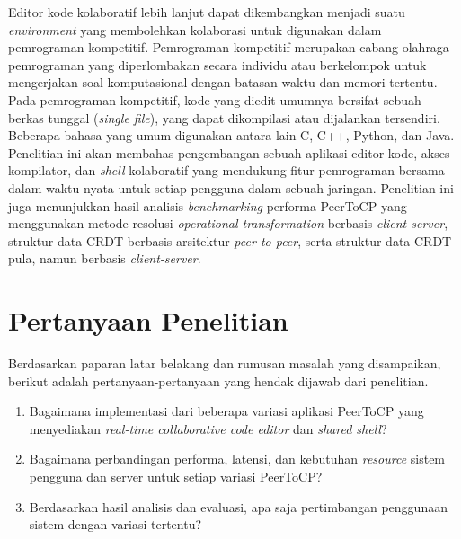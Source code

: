 Editor kode kolaboratif lebih lanjut dapat dikembangkan menjadi suatu \textit{environment} yang membolehkan kolaborasi untuk digunakan dalam pemrograman kompetitif. Pemrograman kompetitif merupakan cabang olahraga pemrograman yang diperlombakan secara individu atau berkelompok untuk mengerjakan soal komputasional dengan batasan waktu dan memori tertentu. Pada pemrograman kompetitif, kode yang diedit umumnya bersifat sebuah berkas tunggal (\textit{single file}), yang dapat dikompilasi atau dijalankan tersendiri. Beberapa bahasa yang umum digunakan antara lain C, C++, Python, dan Java. Penelitian ini akan membahas pengembangan sebuah aplikasi editor kode, akses kompilator, dan \textit{shell} kolaboratif yang mendukung fitur pemrograman bersama dalam waktu nyata untuk setiap pengguna dalam sebuah jaringan. Penelitian ini juga menunjukkan hasil analisis \textit{benchmarking} performa PeerToCP yang menggunakan metode resolusi \textit{operational transformation} berbasis \textit{client-server}, struktur data CRDT berbasis arsitektur \textit{peer-to-peer}, serta struktur data CRDT pula, namun berbasis \textit{client-server}.



\section{Pertanyaan Penelitian}
\label{sec:definisiMasalah}
Berdasarkan paparan latar belakang dan rumusan masalah yang disampaikan, berikut adalah pertanyaan-pertanyaan yang hendak dijawab dari penelitian.

\begin{enumerate}[noitemsep]
    \item Bagaimana implementasi dari beberapa variasi aplikasi PeerToCP yang menyediakan \textit{real-time collaborative code editor} dan \textit{shared shell}?
    \item Bagaimana perbandingan performa, latensi, dan kebutuhan \textit{resource} sistem pengguna dan server untuk setiap variasi PeerToCP?
    \item Berdasarkan hasil analisis dan evaluasi, apa saja pertimbangan penggunaan sistem dengan variasi tertentu?
\end{enumerate}



